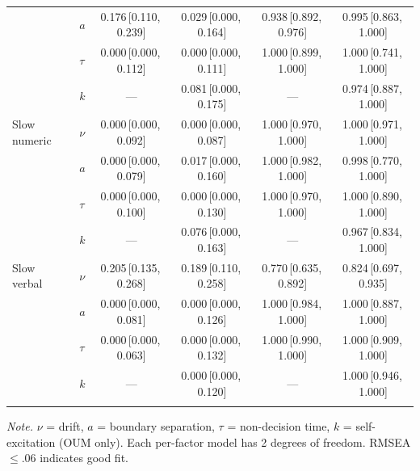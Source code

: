 \begin{table}[ht]
\begin{tabular}{ll cc cc}
 & $a$ & 0.176\,[0.110,\,0.239] & 0.029\,[0.000,\,0.164] & 0.938\,[0.892,\,0.976] & 0.995\,[0.863,\,1.000] \\
 & $\tau$ & 0.000\,[0.000,\,0.112] & 0.000\,[0.000,\,0.111] & 1.000\,[0.899,\,1.000] & 1.000\,[0.741,\,1.000] \\
 & $k$ & --- & 0.081\,[0.000,\,0.175] & --- & 0.974\,[0.887,\,1.000] \\
\addlinespace
Slow numeric & $\nu$ & 0.000\,[0.000,\,0.092] & 0.000\,[0.000,\,0.087] & 1.000\,[0.970,\,1.000] & 1.000\,[0.971,\,1.000] \\
 & $a$ & 0.000\,[0.000,\,0.079] & 0.017\,[0.000,\,0.160] & 1.000\,[0.982,\,1.000] & 0.998\,[0.770,\,1.000] \\
 & $\tau$ & 0.000\,[0.000,\,0.100] & 0.000\,[0.000,\,0.130] & 1.000\,[0.970,\,1.000] & 1.000\,[0.890,\,1.000] \\
 & $k$ & --- & 0.076\,[0.000,\,0.163] & --- & 0.967\,[0.834,\,1.000] \\
\addlinespace
Slow verbal & $\nu$ & 0.205\,[0.135,\,0.268] & 0.189\,[0.110,\,0.258] & 0.770\,[0.635,\,0.892] & 0.824\,[0.697,\,0.935] \\
 & $a$ & 0.000\,[0.000,\,0.081] & 0.000\,[0.000,\,0.126] & 1.000\,[0.984,\,1.000] & 1.000\,[0.887,\,1.000] \\
 & $\tau$ & 0.000\,[0.000,\,0.063] & 0.000\,[0.000,\,0.132] & 1.000\,[0.990,\,1.000] & 1.000\,[0.909,\,1.000] \\
 & $k$ & --- & 0.000\,[0.000,\,0.120] & --- & 1.000\,[0.946,\,1.000] \\
\addlinespace
\bottomrule
\end{tabular}
\vspace{4pt}
\noindent\textit{Note.} $\nu$ = drift, $a$ = boundary separation, $\tau$ = non-decision time, $k$ = self-excitation (OUM only). Each per-factor model has 2 degrees of freedom. RMSEA $\le .06$ indicates good fit.
\end{table}
